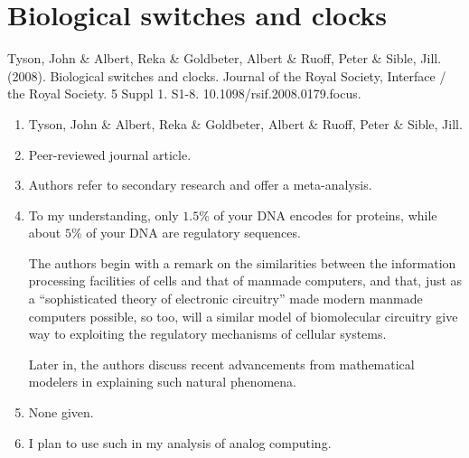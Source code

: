 \section*{Biological switches and clocks}
Tyson, John \& Albert, Reka \& Goldbeter, Albert \& Ruoff, Peter \& Sible, Jill. (2008). Biological switches and clocks. Journal of the Royal Society, Interface / the Royal Society. 5 Suppl 1. S1-8. 10.1098/rsif.2008.0179.focus. 
\begin{enumerate}
    \item Tyson, John \& Albert, Reka \& Goldbeter, Albert \& Ruoff, Peter \& Sible, Jill.
    \item Peer-reviewed journal article.
    \item Authors refer to secondary research and offer a meta-analysis.
    \item To my understanding, only $1.5\%$ of your DNA encodes for proteins, while about $5\%$ of your DNA are regulatory sequences.
    
    The authors begin with a remark on the similarities between the information processing facilities of cells and that of manmade computers, and that, just as a ``sophisticated theory of electronic circuitry'' made modern manmade computers possible, so too, will a similar model of biomolecular circuitry give way to exploiting the regulatory mechanisms of cellular systems. 

    Later in, the authors discuss recent advancements from mathematical modelers in explaining such natural phenomena.
    \item None given. 
    \item I plan to use such in my analysis of analog computing. 
\end{enumerate}

